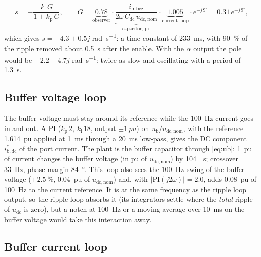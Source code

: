 \documentclass[11pt,a4paper]{scrartcl}
\newcommand{\ped}[1]{_{\mathrm{#1}}}
\begin{document}
\begin{onehalfspace}
\begin{equation}
	s = -\frac{k\ped{i}\, G}{1 + k\ped{p}\, G},
	\qquad G = \underbrace{0.78}_{\text{observer}} \cdot \underbrace{\frac{i\ped{b,bez}}{2\omega\, C\ped{dc}\, u\ped{dc,nom}}}_{\text{capacitor, pu}} \cdot \underbrace{1.005}_{\text{current loop}} \cdot e^{-j\, 9^\circ} = 0.31\, e^{-j\, 9^\circ},
	\label{eq:envelope}
\end{equation}
which gives $s = -4.3 + 0.5j$ \si{\radian\per\second}: a time constant of \SI{233}{\milli\second}, with \SI{90}{\percent} of the ripple removed about \SI{0.5}{\second} after the enable. With the $\alpha$ output the pole would be $-2.2 - 4.7j$ \si{\radian\per\second}: twice as slow and oscillating with a period of \SI{1.3}{\second}.

\subsection{Buffer voltage loop}

The buffer voltage must stay around its reference while the \SI{100}{\hertz} current goes in and out. A PI ($k\ped{p}\,2$, $k\ped{i}\,18$, output $\pm\SI{1}{pu}$) on $u\ped{b}/u\ped{dc,nom}$, with the reference \SI{1.614}{pu} applied at \SI{1}{\milli\second} through a \SI{20}{\milli\second} low-pass, gives the DC component $i\ped{b,dc}^*$ of the port current. The plant is the buffer capacitor through \eqref{eq:ub}: \SI{1}{pu} of current changes the buffer voltage (in pu of $u\ped{dc,nom}$) by \SI{104}{\per\second}; crossover \SI{33}{\hertz}, phase margin \SI{84}{\degree}. This loop also sees the \SI{100}{\hertz} swing of the buffer voltage ($\pm\SI{2.5}{\percent}$, \SI{0.04}{pu} of $u\ped{dc,nom}$) and, with $|\mathrm{PI}(j2\omega)| = 2.0$, adds \SI{0.08}{pu} of \SI{100}{\hertz} to the current reference. It is at the same frequency as the ripple loop output, so the ripple loop absorbs it (its integrators settle where the \emph{total} ripple of $u\ped{dc}$ is zero), but a notch at \SI{100}{\hertz} or a moving average over \SI{10}{\milli\second} on the buffer voltage would take this interaction away.

\subsection{Buffer current loop}


\end{onehalfspace}
\end{document}
